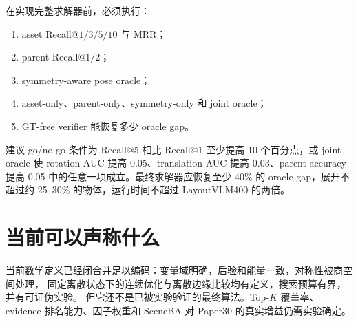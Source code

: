 \documentclass[11pt,a4paper]{ctexart}
\begin{document}
在实现完整求解器前，必须执行：
\begin{enumerate}
  \item asset Recall@$1/3/5/10$ 与 MRR；
  \item parent Recall@$1/2$；
  \item symmetry-aware pose oracle；
  \item asset-only、parent-only、symmetry-only 和 joint oracle；
  \item GT-free verifier 能恢复多少 oracle gap。
\end{enumerate}
建议 go/no-go 条件为 Recall@5 相比 Recall@1 至少提高 10 个百分点，或 joint oracle
使 rotation AUC 提高 0.05、translation AUC 提高 0.03、parent accuracy 提高 0.05
中的任意一项成立。最终求解器应恢复至少 40\% 的 oracle gap，展开不超过约
25--30\% 的物体，运行时间不超过 LayoutVLM400 的两倍。

\section{当前可以声称什么}
当前数学定义已经闭合并足以编码：变量域明确，后验和能量一致，对称性被商空间处理，
固定离散状态下的连续优化与离散边缘比较均有定义，搜索预算有界，并有可证伪实验。
但它还不是已被实验验证的最终算法。Top-$K$ 覆盖率、evidence 排名能力、因子权重和
SceneBA 对 Paper30 的真实增益仍需实验确定。
\end{document}
